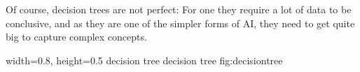 Of course, decision trees are not perfect: For one they require a lot of data to be conclusive, and as they are one of the simpler forms of AI, they need to get quite big to capture complex concepts.

    {width=0.8\textwidth, height=0.5\textheight} %
    {decision tree}   %
    {decision tree}   %
    {fig:decisiontree}    %